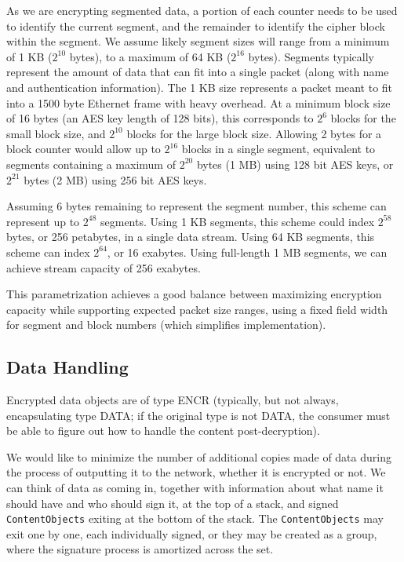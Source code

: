 As we are encrypting segmented data, a portion of each counter needs
to be used to identify the current segment, and the remainder to
identify the cipher block within the segment. We assume likely segment
sizes will range from a minimum of 1 KB ($2^{10}$ bytes), to a maximum
of 64 KB ($2^{16}$ bytes). Segments typically represent the amount of
data that can fit into a single packet (along with name and
authentication information). The 1 KB size represents a packet meant
to fit into a 1500 byte Ethernet frame with heavy overhead. At a
minimum block size of 16 bytes (an AES key length of 128 bits), this
corresponds to $2^{6}$ blocks for the small block size, and $2^{10}$
blocks for the large block size. Allowing 2 bytes for a block counter
would allow up to $2^{16}$ blocks in a single segment, equivalent to
segments containing a maximum of $2^{20}$ bytes (1 MB) using 128 bit
AES keys, or $2^{21}$ bytes (2 MB) using 256 bit AES keys.

Assuming 6 bytes remaining to represent the segment number, this
scheme can represent up to $2^{48}$ segments. Using 1 KB segments,
this scheme could index $2^{58}$ bytes, or 256 petabytes, in a single
data stream. Using 64 KB segments, this scheme can index $2^{64}$, or
16 exabytes. Using full-length 1 MB segments, we can achieve stream
capacity of 256 exabytes.

This parametrization achieves a good balance between maximizing
encryption capacity while supporting expected packet size ranges,
using a fixed field width for segment and block numbers (which
simplifies implementation).


\subsection{Data Handling}

Encrypted data objects are of type ENCR (typically, but not always,
encapsulating type DATA; if the original type is not DATA, the
consumer must be able to figure out how to handle the content
post-decryption).

We would like to minimize the number of additional copies made of data
during the process of outputting it to the network, whether it is
encrypted or not. We can think of data as coming in, together with
information about what name it should have and who should sign it, at
the top of a stack, and signed {\tt ContentObjects} exiting at the
bottom of the stack. The {\tt ContentObjects} may exit one by one,
each individually signed, or they may be created as a group, where the
signature process is amortized across the set.


